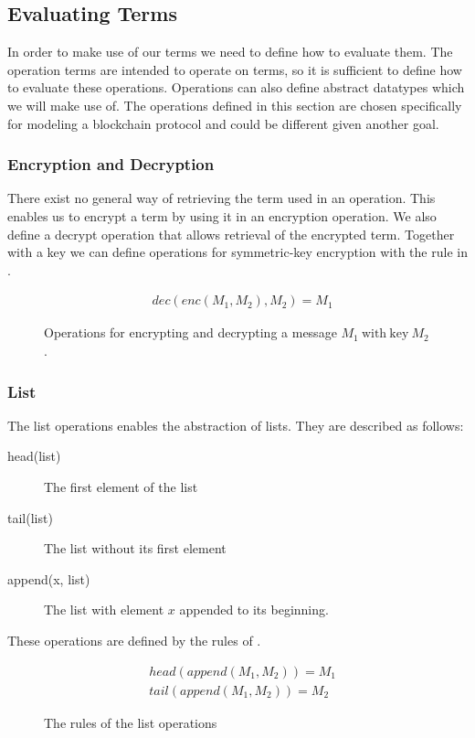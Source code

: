 \subsection{Evaluating Terms}
In order to make use of our terms we need to define how to evaluate them.
The operation terms are intended to operate on terms, so it is sufficient to define how to evaluate these operations.
Operations can also define abstract datatypes which we will make use of.
The operations defined in this section are chosen specifically for modeling a blockchain protocol and could be different given another goal.



\subsubsection{Encryption and Decryption}
There exist no general way of retrieving the term used in an operation.
This enables us to encrypt a term by using it in an encryption operation.
We also define a decrypt operation that allows retrieval of the encrypted term.
Together with a key we can define operations for symmetric-key encryption with the rule in .

\begin{figure}[h]
    \begin{align*}
        &dec(enc(M_1, M_2),M_2) = M_1 \tag{Decrypt}
    \end{align*}
    \caption{Operations for encrypting and decrypting a message $M_1\ \mathrm{with\ key}\ M_2$.}
    \label{decryptrule}
\end{figure}
\FloatBarrier

\subsubsection{List}
The list operations enables the abstraction of lists.
They are described as follows:

\begin{description}
	\item[head(list)] The first element of the list
	\item[tail(list)] The list without its first element
	\item[append(x, list)] The list with element $x$ appended to its beginning.
\end{description}

These operations are defined by the rules of .

\begin{figure}[h]
	\begin{align*}
		&head(append(M_1, M_2)) = M_1 \tag{Head} \\
		&tail(append(M_1, M_2)) = M_2 \tag{Tail}
	\end{align*}
	\caption{The rules of the list operations}
	\label{listoprules}
\end{figure}

\FloatBarrier


